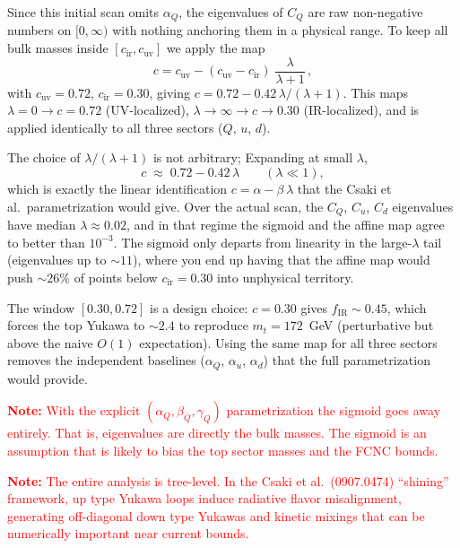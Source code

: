 \documentclass[11pt]{article}
\begin{document}
Since this initial scan omits $\alpha_Q$, the eigenvalues of $C_Q$ are raw
non-negative numbers on $[0,\infty)$ with nothing anchoring them in a
physical range. To keep all bulk masses inside $[c_{\mathrm{ir}},
c_{\mathrm{uv}}]$ we apply the map
\begin{equation}
  c = c_{\mathrm{uv}} - (c_{\mathrm{uv}} - c_{\mathrm{ir}})
    \;\frac{\lambda}{\lambda + 1}\,,
\end{equation}
with $c_{\mathrm{uv}} = 0.72$, $c_{\mathrm{ir}} = 0.30$, giving
$c = 0.72 - 0.42\,\lambda/(\lambda+1)$. This maps $\lambda = 0 \to c = 0.72$
(UV-localized), $\lambda \to \infty \to c \to 0.30$ (IR-localized), and is
applied identically to all three sectors ($Q$, $u$, $d$).


The choice of $\lambda/(\lambda+1)$ is not arbitrary; Expanding at small $\lambda$,
\begin{equation}
  c \;\approx\; 0.72 - 0.42\,\lambda \qquad (\lambda \ll 1),
\end{equation}
which is exactly the linear identification $c = \alpha - \beta\,\lambda$
that the Csaki et al.\ parametrization would give. Over the actual scan,
the $C_Q$, $C_u$, $C_d$ eigenvalues have median $\lambda \approx 0.02$,
and in that regime the sigmoid and the affine map agree to better than
$10^{-3}$. The sigmoid only departs from linearity in the large-$\lambda$
tail (eigenvalues up to $\sim\!11$), where you end up having that the affine map would push
$\sim\!26\%$ of points below $c_{\mathrm{ir}} = 0.30$ into unphysical
territory.


The window $[0.30, 0.72]$ is a design choice: $c = 0.30$ gives
$f_{\mathrm{IR}} \sim 0.45$, which forces the top Yukawa to $\sim 2.4$
to reproduce $m_t = 172$~GeV (perturbative but above the naive $O(1)$
expectation). Using the same map for all three sectors removes the
independent baselines ($\alpha_Q$, $\alpha_u$, $\alpha_d$) that the full
parametrization would provide.

\textcolor{red}{\textbf{Note:} With the explicit $(\alpha_Q, \beta_Q,
\gamma_Q)$ parametrization the sigmoid goes away entirely. That is, eigenvalues are
directly the bulk masses. The sigmoid
is an assumption that is likely to bias the top sector masses and the FCNC
bounds.}

\textcolor{red}{\textbf{Note:} The entire analysis is tree-level.
In the Csaki et al.\ (0907.0474) ``shining'' framework, up type Yukawa
loops induce radiative flavor misalignment, generating off-diagonal
down type Yukawas and kinetic mixings that can be numerically important
near current bounds.}
\end{document}

